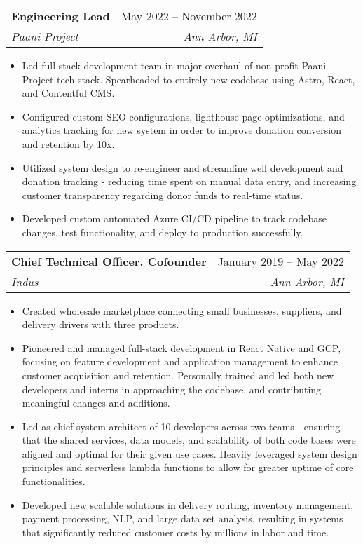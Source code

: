 \documentclass[letterpaper,11pt]{article}
\makeatletter
\newcommand{\resumeItem}[1]{
  \item\small{
    {#1 \vspace{-2pt}}
  }
}
\newcommand{\resumeSubheading}[4]{
  \vspace{-2pt}\item
    \begin{tabular*}{0.97\textwidth}[t]{l@{\extracolsep{\fill}}r}
      \textbf{#1} & #2 \\
      \textit{\small#3} & \textit{\small #4} \\
    \end{tabular*}\vspace{-7pt}
}
\newcommand{\resumeSubSubheading}[2]{
    \item
    \begin{tabular*}{0.97\textwidth}{l@{\extracolsep{\fill}}r}
      \textit{\small#1} & \textit{\small #2} \\
    \end{tabular*}\vspace{-7pt}
}
\newcommand{\resumeSubHeadingListEnd}{\end{itemize}}
\newcommand{\resumeItemListStart}{\begin{itemize}}
\newcommand{\resumeItemListEnd}{\end{itemize}\vspace{-5pt}}
\makeatother
\begin{document}
      \resumeSubheading
      {Engineering Lead}{May 2022 -- November 2022}
      {Paani Project}{Ann Arbor, MI}
      \resumeItemListStart
        \resumeItem{Led full-stack development team in major overhaul of non-profit Paani Project tech stack. Spearheaded to entirely new codebase using Astro, React, and Contentful CMS.}
        \resumeItem{Configured custom SEO configurations, lighthouse page optimizations, and analytics tracking for new system in order to improve donation conversion and retention by 10x.}
        \resumeItem{Utilized system design to re-engineer and streamline well development and donation tracking - reducing time spent on manual data entry, and increasing customer transparency regarding donor funds to real-time status.}
        \resumeItem{Developed custom automated Azure CI/CD pipeline to track codebase changes, test functionality, and deploy to production successfully. }
      \resumeItemListEnd

    \resumeSubheading
      {Chief Technical Officer. Cofounder}{January 2019 -- May 2022}
      {Indus}{Ann Arbor, MI}
      \resumeItemListStart
        \resumeItem{Created wholesale marketplace connecting small businesses, suppliers, and delivery drivers with three products.}
        \resumeItem{Pioneered and managed full-stack development in React Native and GCP, focusing on feature development and application management to enhance customer acquisition and retention. Personally trained and led both new developers and interns in approaching the codebase, and contributing meaningful changes and additions.}
        \resumeItem{Led as chief system architect of 10 developers across two teams - ensuring that the shared services, data models, and scalability of both code bases were aligned and optimal for their given use cases. Heavily leveraged system design principles and serverless lambda functions to allow for greater uptime of core functionalities.}
        \resumeItem{Developed new scalable solutions in delivery routing, inventory management, payment processing, NLP, and large data set analysis, resulting in systems that significantly reduced customer costs by millions in labor and time.}
    \resumeItemListEnd
\end{document}
